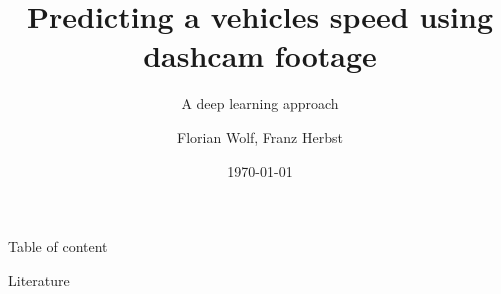 \documentclass[handout, 10pt, aspectratio=43]{beamer}
\title{Predicting a vehicles speed using dashcam footage} %
\subtitle{A deep learning approach}
\author{Florian Wolf, Franz Herbst}
\institute[Universität Konstanz]{
    Machine Learning using Matlab \\
    Universität Konstanz
} %
\date{\today}
\begin{document}
    \RaggedRight
    \frame{\titlepage}
    
    \begin{frame}{Table of content}
        \tableofcontents
    \end{frame}
    
    
    
    
    

    \begin{frame}[allowframebreaks]{Literature}
    	\nocite{*}
        \printbibliography
     \end{frame}
\end{document}
